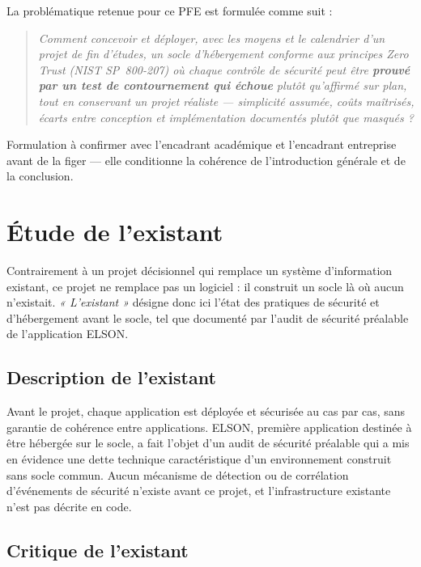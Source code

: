 La problématique retenue pour ce PFE est formulée comme suit :

\begin{quote}
\itshape
Comment concevoir et déployer, avec les moyens et le calendrier d'un projet de fin
d'études, un socle d'hébergement conforme aux principes Zero Trust (NIST SP~800-207) où
chaque contrôle de sécurité peut être \textbf{prouvé par un test de contournement qui
échoue} plutôt qu'affirmé sur plan, tout en conservant un projet réaliste --- simplicité
assumée, coûts maîtrisés, écarts entre conception et implémentation documentés plutôt que
masqués ?
\end{quote}

\begin{attentedoc}
Formulation à confirmer avec l'encadrant académique et l'encadrant entreprise avant de la
figer --- elle conditionne la cohérence de l'introduction générale et de la conclusion.
\end{attentedoc}

\section{Étude de l'existant}
\label{sec:etude-existant}

Contrairement à un projet décisionnel qui remplace un système d'information existant, ce
projet ne remplace pas un logiciel : il construit un socle là où aucun n'existait.
\emph{« L'existant »} désigne donc ici l'état des pratiques de sécurité et d'hébergement
avant le socle, tel que documenté par l'audit de sécurité préalable de l'application ELSON.

\subsection{Description de l'existant}

Avant le projet, chaque application est déployée et sécurisée au cas par cas, sans garantie
de cohérence entre applications. ELSON, première application destinée à être hébergée sur le
socle, a fait l'objet d'un audit de sécurité préalable qui a mis en évidence une dette
technique caractéristique d'un environnement construit sans socle commun. Aucun mécanisme de
détection ou de corrélation d'événements de sécurité n'existe avant ce projet, et
l'infrastructure existante n'est pas décrite en code.

\subsection{Critique de l'existant}

